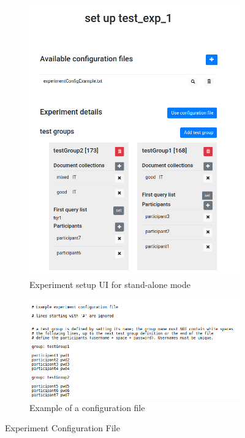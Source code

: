 \documentclass[a4paper]{usiinfbachelorproject}
\begin{document}
\begin{appendices}
        \begin{figure} [ht]
             \centering
             \hfill
             \begin{subfigure}{0.32\textwidth}
                 \centering
                 \includegraphics[width=\textwidth]{figures/expSetup1}
                 \caption{Experiment setup UI for stand-alone mode}
                 \label{fig:expSetupUi1}
             \end{subfigure}
             \hfill
             \begin{subfigure}{0.5\textwidth}
                 \centering
                 \includegraphics[width=\textwidth]{figures/expConfigFile}
                 \caption{Example of a configuration file}
                 \label{fig:expConfigFile}
             \end{subfigure}
             \hfill
             \caption[]{Experiment Configuration File}
             \label{fig:expConfigUi1}
        \end{figure}


\end{appendices}
\end{document}
